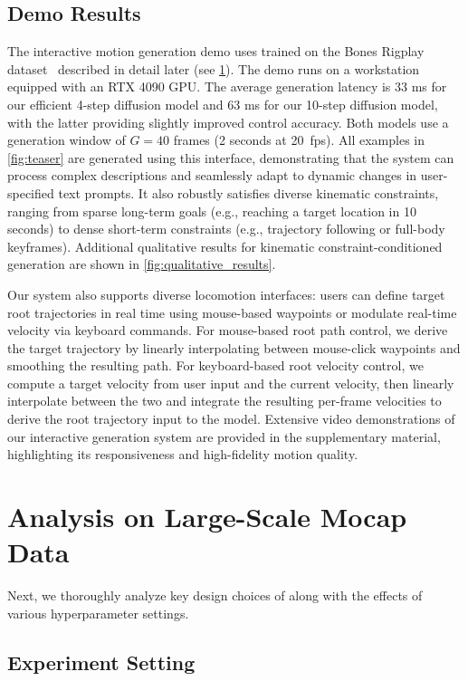 \subsection{Demo Results}
The interactive motion generation demo uses \method trained on the Bones Rigplay dataset~\cite{BonesStudio2026} described in detail later (see \cref{sec:results_internal}). The demo runs on a workstation equipped with an RTX 4090 GPU. The average generation latency is 33 ms for our efficient 4-step diffusion model and 63 ms for our 10-step diffusion model, with the latter providing slightly improved control accuracy.
Both models use a generation window of $G = 40$ frames (2 seconds at 20~fps).
All examples in \cref{fig:teaser} are generated using this interface, demonstrating that the system can process complex descriptions and seamlessly adapt to dynamic changes in user-specified text prompts. It also robustly satisfies diverse kinematic constraints, ranging from sparse long-term goals (e.g., reaching a target location in 10 seconds) to dense short-term constraints (e.g., trajectory following or full-body keyframes). 
Additional qualitative results for kinematic constraint-conditioned generation are shown in \cref{fig:qualitative_results}.

Our system also supports diverse locomotion interfaces: users can define target root trajectories in real time using mouse-based waypoints or modulate real-time velocity via keyboard commands.
For mouse-based root path control, we derive the target trajectory by linearly interpolating between mouse-click waypoints and smoothing the resulting path.
For keyboard-based root velocity control, we compute a target velocity from user input and the current velocity, then linearly interpolate between the two and integrate the resulting per-frame velocities to derive the root trajectory input to the model.
Extensive video demonstrations of our interactive generation system are provided in the supplementary material, highlighting its responsiveness and high-fidelity motion quality.

\section{Analysis on Large-Scale Mocap Data}
\label{sec:results_internal}
Next, we thoroughly analyze key design choices of \method along with the effects of various hyperparameter settings.

\subsection{Experiment Setting}
